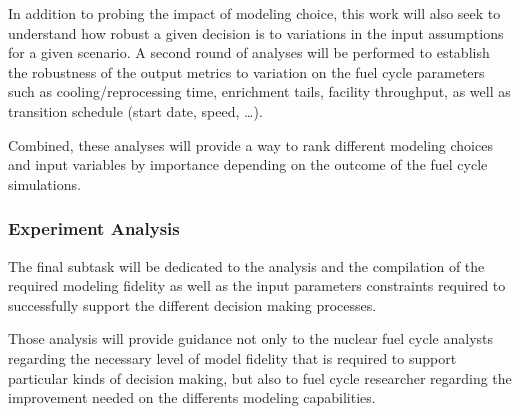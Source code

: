 In addition to probing the impact of modeling choice, this work will also seek
to understand how robust a given decision is to variations in the input
assumptions for a given scenario.  A second round of analyses will be performed
to establish the robustness of the output metrics to variation on the fuel cycle
parameters such as cooling/reprocessing time, enrichment tails, facility
throughput, as well as transition schedule (start date, speed, \dots).

Combined, these analyses will provide a way to rank different modeling choices
and input variables by importance depending on the outcome of the fuel cycle
simulations.

\subsubsection{Experiment Analysis}

The final subtask will be dedicated to the analysis and the compilation of the
required modeling fidelity as well as the input parameters constraints required
to successfully support the different decision making processes.

Those analysis will provide guidance not only to the nuclear fuel cycle analysts
regarding the necessary level of model fidelity that is required to support
particular kinds of decision making, but also to fuel cycle researcher regarding
the improvement needed on the differents modeling capabilities.
